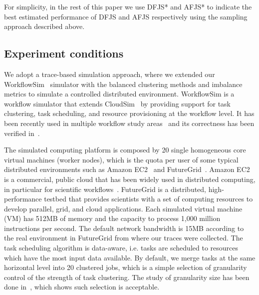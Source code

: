 \documentclass[final,5p,times,twocolumn]{elsarticle}
\begin{document}
For simplicity, in the rest of this paper we use DFJS* and AFJS* to indicate the best estimated performance of DFJS and AFJS respectively using the sampling approach described above.


\subsection{Experiment conditions}
\label{sec:experiment_conditions}
We adopt a trace-based simulation approach, where we extended our WorkflowSim~\cite{Chen2012a} simulator with the balanced clustering methods and imbalance metrics to simulate a controlled distributed environment. WorkflowSim is a workflow simulator that extends CloudSim~\cite{Calheiros2011} by providing support for task clustering, task scheduling, and resource provisioning at the workflow level. It has been recently used in multiple workflow study areas~\cite{6683907,Chen2012, jrad2013broker} and its correctness has been verified in~\cite{Chen2012a}. 

The simulated computing platform is composed by 20 single homogeneous core virtual machines (worker nodes), which is the quota per user of some typical distributed environments such as Amazon EC2~\cite{AmazonAWS} and FutureGrid~\cite{FutureGrid}. Amazon EC2 is a commercial, public cloud that has been widely used in distributed computing, in particular for scientific workflows~\cite{Juve09scientificworkflow}. FutureGrid is a distributed, high-performance testbed that provides scientists with a set of computing resources to develop parallel, grid, and cloud applications. Each simulated virtual machine (VM) has 512MB of memory and the capacity to process 1,000 million instructions per second. The default network bandwidth is 15MB according to the real environment in FutureGrid from where our traces were collected. The task scheduling algorithm is data-aware, i.e. tasks are scheduled to resources which have the most input data available. By default, we merge tasks at the same horizontal level into 20 clustered jobs, which is a simple selection of granularity control of the strength of task clustering. The study of granularity size has been done in~\cite{6683907}, which shows such selection is acceptable. 
\end{document}
